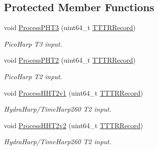 \subsection*{Protected Member Functions}
\begin{DoxyCompactItemize}
\item 
\mbox{\label{class_p_q_aa2dfcf0c8756cd0dc96a451dc1a8be83}} 
void \hyperlink{class_p_q_aa2dfcf0c8756cd0dc96a451dc1a8be83}{Process\+P\+H\+T3} (uint64\+\_\+t \hyperlink{class_t_t_t_r_aeca22c4f524dbb501b7545d397e8f782}{T\+T\+T\+R\+Record})
\begin{DoxyCompactList}\small\item\em Pico\+Harp T3 input. \end{DoxyCompactList}\item 
\mbox{\label{class_p_q_ac817f86c251e4dd17ae59c2ee4d8b088}} 
void \hyperlink{class_p_q_ac817f86c251e4dd17ae59c2ee4d8b088}{Process\+P\+H\+T2} (uint64\+\_\+t \hyperlink{class_t_t_t_r_aeca22c4f524dbb501b7545d397e8f782}{T\+T\+T\+R\+Record})
\begin{DoxyCompactList}\small\item\em Pico\+Harp T2 input. \end{DoxyCompactList}\item 
\mbox{\label{class_p_q_a1be8f4b5ffd44b6a812b2ea87c251db5}} 
void \hyperlink{class_p_q_a1be8f4b5ffd44b6a812b2ea87c251db5}{Process\+H\+H\+T2v1} (uint64\+\_\+t \hyperlink{class_t_t_t_r_aeca22c4f524dbb501b7545d397e8f782}{T\+T\+T\+R\+Record})
\begin{DoxyCompactList}\small\item\em Hydra\+Harp/\+Time\+Harp260 T2 input. \end{DoxyCompactList}\item 
\mbox{\label{class_p_q_a6c7d03e35a0a3a12b7946db6dadf1d91}} 
void \hyperlink{class_p_q_a6c7d03e35a0a3a12b7946db6dadf1d91}{Process\+H\+H\+T2v2} (uint64\+\_\+t \hyperlink{class_t_t_t_r_aeca22c4f524dbb501b7545d397e8f782}{T\+T\+T\+R\+Record})
\begin{DoxyCompactList}\small\item\em Hydra\+Harp/\+Time\+Harp260 T2 input. \end{DoxyCompactList}\item 
\mbox{\label{class_p_q_a9296d47519a9a58945acb1cb78d63f4d}} 

\end{DoxyCompactItemize}
